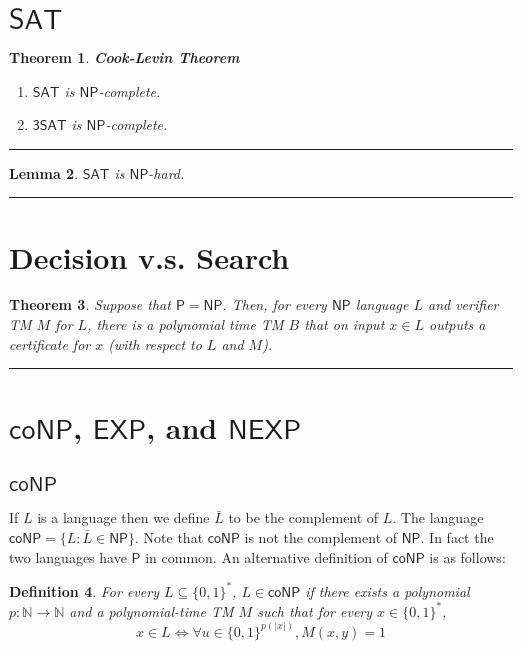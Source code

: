 \documentclass[twoside]{article}
\newcounter{lecnum}
\newtheorem{theorem}{Theorem}[lecnum]
\newtheorem{lemma}[theorem]{Lemma}
\newtheorem{definition}[theorem]{Definition}
\newenvironment{proof}{{\bf Proof:}}{\hfill\rule{2mm}{2mm}}
\def\N{\mathbb{N}}
\def\P{\mathsf{P}}
\def\NP{\mathsf{NP}}
\def\coNP{\mathsf{coNP}}
\begin{document}
\section{$\mathsf{SAT}$}
\begin{theorem}
\textbf{Cook-Levin Theorem} 
\begin{enumerate}
\item $\mathsf{SAT}$ is $\mathsf{NP}$-complete.
\item $\mathsf{3SAT}$ is $\mathsf{NP}$-complete.
\end{enumerate}
\end{theorem}
\begin{proof}

\end{proof}

\begin{lemma}
$\mathsf{SAT}$ is $\mathsf{NP}$-hard. 
\end{lemma}
\begin{proof}

\end{proof}

\section{Decision v.s. Search}
\begin{theorem}
Suppose that $\mathsf{P} = \mathsf{NP}$. Then, for every $\mathsf{NP}$ language $L$ and verifier TM $M$ for $L$, there is a polynomial time TM $B$ that on input $x \in L$ outputs a certificate for $x$ (with respect to $L$ and $M$). 
\end{theorem}
\begin{proof}

\end{proof}

\section{$\mathsf{coNP}$, $\mathsf{EXP}$, and $\mathsf{NEXP}$}
\subsection{$\mathsf{coNP}$}
If $L$ is a language then we define $\bar{L}$ to be the complement of $L$. The language $\coNP = \{L: \bar{L} \in \NP\}$. Note that $\coNP$ is not the complement of $\NP$. In fact the two languages have $\P$ in common. An alternative definition of $\coNP$ is as follows:

\begin{definition}
For every $L \subseteq \{0,1\}^*$, $L \in \coNP$ if there exists a polynomial $p: \N \rightarrow \N$ and a polynomial-time TM $M$ such that for every $x \in \{0,1\}^*$, 
\[x \in L \iff \forall u \in \{0,1\}^{p(|x|)}, M(x,y) = 1\]
\end{definition}
\end{document}
